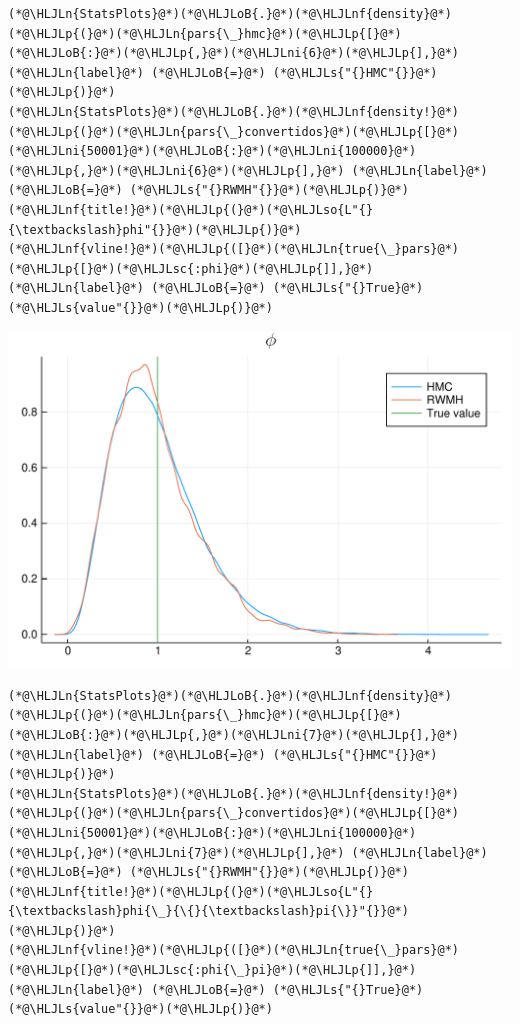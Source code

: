 \documentclass[12pt,a4paper]{article}
\newcommand{\HLJLn}[1]{#1}
\newcommand{\HLJLnf}[1]{\textcolor[RGB]{66,102,213}{#1}}
\newcommand{\HLJLs}[1]{\textcolor[RGB]{201,61,57}{#1}}
\newcommand{\HLJLsc}[1]{\textcolor[RGB]{201,61,57}{#1}}
\newcommand{\HLJLso}[1]{\textcolor[RGB]{201,61,57}{#1}}
\newcommand{\HLJLni}[1]{\textcolor[RGB]{59,151,46}{#1}}
\newcommand{\HLJLoB}[1]{\textcolor[RGB]{102,102,102}{\textbf{#1}}}
\newcommand{\HLJLp}[1]{#1}
\begin{document}
\begin{lstlisting}
(*@\HLJLn{StatsPlots}@*)(*@\HLJLoB{.}@*)(*@\HLJLnf{density}@*)(*@\HLJLp{(}@*)(*@\HLJLn{pars{\_}hmc}@*)(*@\HLJLp{[}@*)(*@\HLJLoB{:}@*)(*@\HLJLp{,}@*)(*@\HLJLni{6}@*)(*@\HLJLp{],}@*) (*@\HLJLn{label}@*) (*@\HLJLoB{=}@*) (*@\HLJLs{"{}HMC"{}}@*)(*@\HLJLp{)}@*)
(*@\HLJLn{StatsPlots}@*)(*@\HLJLoB{.}@*)(*@\HLJLnf{density!}@*)(*@\HLJLp{(}@*)(*@\HLJLn{pars{\_}convertidos}@*)(*@\HLJLp{[}@*)(*@\HLJLni{50001}@*)(*@\HLJLoB{:}@*)(*@\HLJLni{100000}@*)(*@\HLJLp{,}@*)(*@\HLJLni{6}@*)(*@\HLJLp{],}@*) (*@\HLJLn{label}@*) (*@\HLJLoB{=}@*) (*@\HLJLs{"{}RWMH"{}}@*)(*@\HLJLp{)}@*)
(*@\HLJLnf{title!}@*)(*@\HLJLp{(}@*)(*@\HLJLso{L"{}{\textbackslash}phi"{}}@*)(*@\HLJLp{)}@*)
(*@\HLJLnf{vline!}@*)(*@\HLJLp{([}@*)(*@\HLJLn{true{\_}pars}@*)(*@\HLJLp{[}@*)(*@\HLJLsc{:phi}@*)(*@\HLJLp{]],}@*) (*@\HLJLn{label}@*) (*@\HLJLoB{=}@*) (*@\HLJLs{"{}True}@*) (*@\HLJLs{value"{}}@*)(*@\HLJLp{)}@*)
\end{lstlisting}

\includegraphics[width=\linewidth]{figures/dsge_and_julia_49_1.pdf}

\begin{lstlisting}
(*@\HLJLn{StatsPlots}@*)(*@\HLJLoB{.}@*)(*@\HLJLnf{density}@*)(*@\HLJLp{(}@*)(*@\HLJLn{pars{\_}hmc}@*)(*@\HLJLp{[}@*)(*@\HLJLoB{:}@*)(*@\HLJLp{,}@*)(*@\HLJLni{7}@*)(*@\HLJLp{],}@*) (*@\HLJLn{label}@*) (*@\HLJLoB{=}@*) (*@\HLJLs{"{}HMC"{}}@*)(*@\HLJLp{)}@*)
(*@\HLJLn{StatsPlots}@*)(*@\HLJLoB{.}@*)(*@\HLJLnf{density!}@*)(*@\HLJLp{(}@*)(*@\HLJLn{pars{\_}convertidos}@*)(*@\HLJLp{[}@*)(*@\HLJLni{50001}@*)(*@\HLJLoB{:}@*)(*@\HLJLni{100000}@*)(*@\HLJLp{,}@*)(*@\HLJLni{7}@*)(*@\HLJLp{],}@*) (*@\HLJLn{label}@*) (*@\HLJLoB{=}@*) (*@\HLJLs{"{}RWMH"{}}@*)(*@\HLJLp{)}@*)
(*@\HLJLnf{title!}@*)(*@\HLJLp{(}@*)(*@\HLJLso{L"{}{\textbackslash}phi{\_}{\{}{\textbackslash}pi{\}}"{}}@*)(*@\HLJLp{)}@*)
(*@\HLJLnf{vline!}@*)(*@\HLJLp{([}@*)(*@\HLJLn{true{\_}pars}@*)(*@\HLJLp{[}@*)(*@\HLJLsc{:phi{\_}pi}@*)(*@\HLJLp{]],}@*) (*@\HLJLn{label}@*) (*@\HLJLoB{=}@*) (*@\HLJLs{"{}True}@*) (*@\HLJLs{value"{}}@*)(*@\HLJLp{)}@*)
\end{lstlisting}
\end{document}
